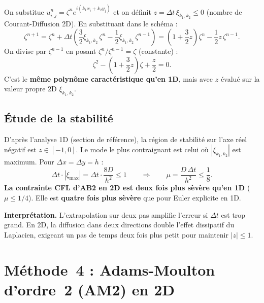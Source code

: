 \documentclass[11pt,a4paper]{report}
\begin{document}
On substitue $u_{i,j}^n=\zeta^n e^{i(k_1x_i+k_2y_j)}$ et on d\'efinit
$z=\Delta t\,\xi_{k_1,k_2}\le 0$ (nombre de Courant-Diffusion 2D).
En substituant dans le sch\'ema :
\begin{equation}
  \zeta^{n+1} = \zeta^n + \Delta t\!\left(\frac{3}{2}\xi_{k_1,k_2}\,\zeta^n
                            - \frac{1}{2}\xi_{k_1,k_2}\,\zeta^{n-1}\right)
              = \left(1+\frac{3}{2}z\right)\zeta^n - \frac{1}{2}z\,\zeta^{n-1}.
\end{equation}
On divise par $\zeta^{n-1}$ en posant $\zeta^n/\zeta^{n-1}=\zeta$ (constante) :
\begin{equation}
  \zeta^2 - \left(1+\frac{3}{2}z\right)\zeta + \frac{z}{2} = 0.
\end{equation}
C'est le \textbf{m\^eme polyn\^ome caract\'eristique qu'en 1D}, mais avec $z$ \'evalu\'e
sur la valeur propre 2D $\xi_{k_1,k_2}$.

\subsection*{\'Etude de la stabilit\'e}

D'apr\`es l'analyse 1D (section de r\'ef\'erence), la r\'egion de stabilit\'e sur
l'axe r\'eel n\'egatif est $z\in[-1,0]$. Le mode le plus contraignant est celui
o\`u $|\xi_{k_1,k_2}|$ est maximum. Pour $\Delta x=\Delta y=h$ :
\begin{equation}
  \Delta t\cdot|\xi_{\max}| = \Delta t\cdot\frac{8D}{h^2} \le 1
  \qquad\Longrightarrow\qquad
  \boxed{\mu = \frac{D\,\Delta t}{h^2} \le \frac{1}{8}.}
\end{equation}
\textbf{La contrainte CFL d'AB2 en 2D est deux fois plus s\`ev\`ere qu'en 1D} ($\mu\le 1/4$).
Elle est \textbf{quatre fois plus s\`ev\`ere} que pour Euler explicite en 1D.

\medskip
\noindent\textbf{Interpr\'etation.} L'extrapolation sur deux pas amplifie l'erreur si
$\Delta t$ est trop grand. En 2D, la diffusion dans deux directions double l'effet
dissipatif du Laplacien, exigeant un pas de temps deux fois plus petit pour maintenir
$|z|\le 1$.

\section{M\'ethode~4 : Adams-Moulton d'ordre~2 (AM2) en 2D}
\end{document}
